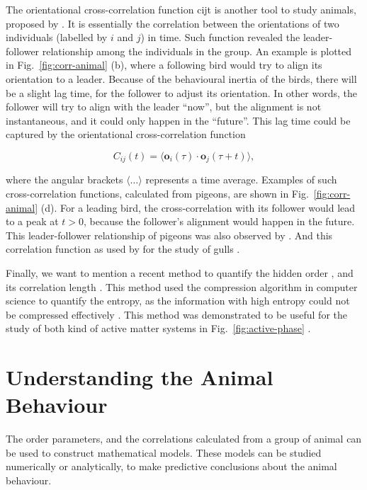 \documentclass[11pt,twoside]{report}
\begin{document}
The orientational cross-correlation function \gls{cijt} is another tool to study animals, proposed by \citeauthor{nagy2010} \cite{nagy2010}. It is essentially the correlation between the orientations of two individuals (labelled by $i$ and $j$) in time. Such function revealed the leader-follower relationship among the individuals in the group. An example is plotted in Fig.~\ref{fig:corr-animal} (b), where a following bird would try to align its orientation to a leader. Because of the behavioural inertia of the birds, there will be a slight lag time, for the follower to adjust its orientation. In other words, the follower will try to align with the leader ``now'', but the alignment is not instantaneous, and it could only happen in the ``future''. This lag time could be captured by the orientational cross-correlation function

\begin{equation}
	C_{ij}(t) = \langle
		\mathbf{o}_{i}(\tau) \cdot \mathbf{o}_{j}(\tau + t)
	\rangle,
\end{equation}

\noindent where the angular brackets $\langle \dots \rangle$ represents a time average. Examples of such cross-correlation functions, calculated from pigeons, are shown in Fig.~\ref{fig:corr-animal} (d). For a leading bird, the cross-correlation with its follower would lead to a peak at $t > 0$, because the follower's alignment would happen in the future. This leader-follower relationship of pigeons was also observed by \citeauthor{chen2015epj} \cite{chen2015epj}. And this correlation function as used by \citeauthor{yomosa2013} for the study of gulls \cite{yomosa2013}.

Finally, we want to mention a recent method to quantify the hidden order \cite{martiniani2019prx}, and its correlation length \cite{martiniani2020}. This method used the compression algorithm in computer science to quantify the entropy, as the information with high entropy could not be compressed effectively \cite{mcanlis2016}. This method was demonstrated to be useful for the study of both kind of active matter systems in Fig.~\ref{fig:active-phase} \cite{martiniani2019prx, cavagna2020}.


\section{Understanding the Animal Behaviour}
\label{section:intro-model-theory}

The order parameters, and the correlations calculated from a group of animal can be used to construct mathematical models. These models can be studied numerically or analytically, to make predictive conclusions about the animal behaviour.
\end{document}
